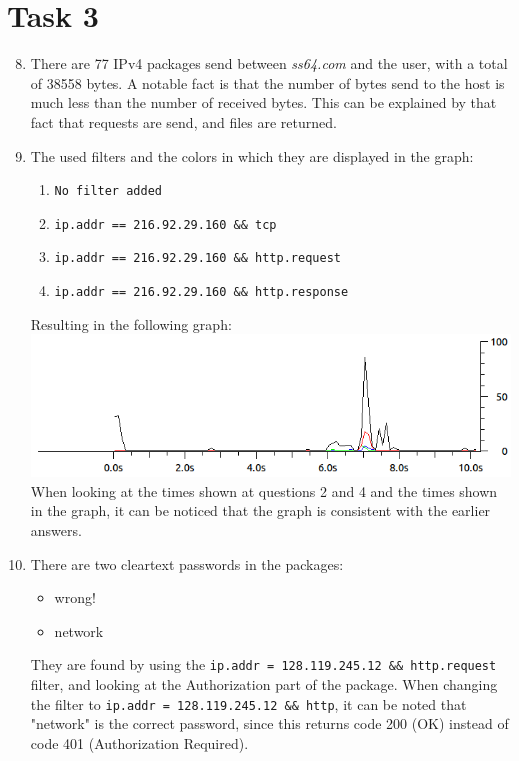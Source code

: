 \documentclass[12pt]{article}
\begin{document}
\section{Task 3}
\begin{enumerate}
    \setcounter{enumi}{7}
    \item There are 77 IPv4 packages send between \emph{ss64.com} and the user, with a total of 38558 bytes. A notable fact is that the number of bytes send to the host is much less than the number of received bytes. This can be explained by that fact that requests are send, and files are returned.
    \clearpage
    \item The used filters and the colors in which they are displayed in the graph:
        \begin{enumerate}
            \item {\color{black}\verb|No filter added|}
            \item {\color{red}\verb|ip.addr == 216.92.29.160 && tcp|}
            \item {\color{green}\verb|ip.addr == 216.92.29.160 && http.request|}
            \item {\color{blue}\verb|ip.addr == 216.92.29.160 && http.response|}
        \end{enumerate}
    Resulting in the following graph: \\
    \includegraphics[width=\textwidth]{graph.png}
    When looking at the times shown at questions 2 and 4 and the times shown in the graph, it can be noticed that the graph is consistent with the earlier answers.
    \item There are two cleartext passwords in the packages:
        \begin{itemize}
            \item wrong!
            \item network
        \end{itemize}
    They are found by using the \verb|ip.addr = 128.119.245.12 && http.request| filter, and looking at the Authorization part of the package. When changing the filter to \verb|ip.addr = 128.119.245.12 && http|, it can be noted that "network" is the correct password, since this returns code 200 (OK) instead of code 401 (Authorization Required).
\end{enumerate}
\end{document}
